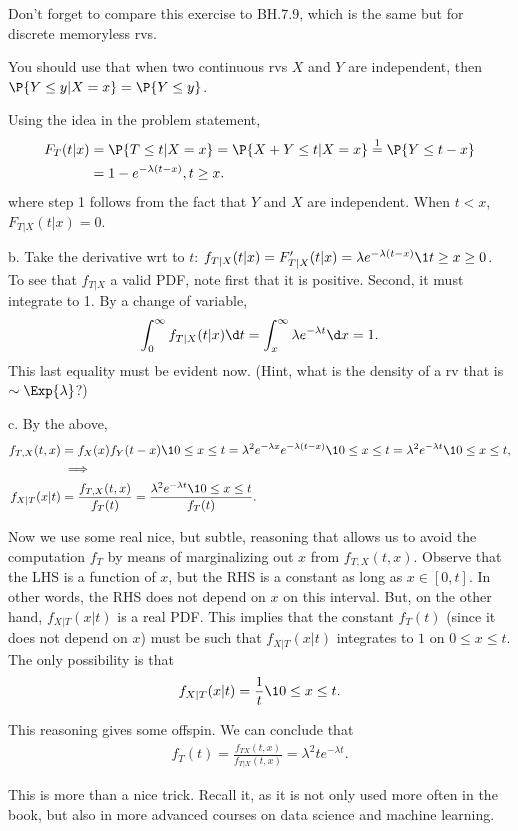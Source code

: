 
\setcounter{theorem}{9}
\begin{exercise}[BH.7.10]
Don't forget to compare  this exercise to BH.7.9, which is the same but for discrete memoryless rvs.

You should use that when two continuous rvs $X$ and $Y$ are independent, then $\P{Y\leq y | X=x} = \P{Y\leq y}$.

\begin{solution}
Using the idea in the problem statement,
\begin{align*}
F_T(t|x) &= \P{T\leq t|X=x} = \P{X+Y\leq t|X=x} \stackrel{1}=\P{Y\leq t-x} \\
&=1 - e^{-\lambda(t-x)}, t \geq x.
\end{align*}
where step 1 follows from the fact that $Y$ and $X$ are independent. When $t<x$, $F_{T|X}(t|x) = 0$.

b. Take the derivative wrt to $t$: $f_{T|X} (t|x) = F_{T|X}'(t|x) = \lambda e^{-\lambda (t-x)}\1{t\geq x\geq 0}$. To see that $f_{T|X}$ a valid PDF, note first that it is positive. Second, it must integrate to 1. By a change of variable,
\begin{align*}
\int_0^{\infty}  f_{T|X} (t|x) \d t = \int_x^{\infty} \lambda e^{-\lambda t} \d x = 1.
\end{align*}
This last equality must be evident now. (Hint, what is the density of a rv  that is $\sim \Exp{\lambda}$?)


c. By the above,
\begin{align*}
f_{T,X}(t,x)  &=  f_X(x)f_Y(t-x) \1{0\leq x \leq t} = \lambda^2 e^{-\lambda x} e^{-\lambda(t-x)} \1{0\leq x \leq t} = \lambda^2e^{-\lambda t} \1{0\leq x\leq t},\\
  &\implies  \\
  f_{X|T}(x|t) &= \frac{f_{T,X}(t,x)}{f_T(t)}  = \frac{\lambda^2e^{-\lambda t} \1{0\leq x\leq t}}{f_T(t)}.
\end{align*}

Now we use some real nice, but subtle, reasoning that allows us to avoid the computation $f_T$ by means of marginalizing out $x$ from $f_{T,X}(t, x)$.
Observe that the LHS is a function of $x$, but the RHS is a constant as long as $x\in [0, t]$.  In other words, the RHS does not depend on $x$ on this interval.
But, on the other hand,  $f_{X|T}(x|t)$ is  a real PDF.
This implies that the constant $f_T(t)$ (since it does not depend on $x$) must be such that $f_{X|T}(x|t)$ integrates to $1$ on $0\leq x \leq t$.
The only possibility is that
\begin{equation*}
f_{X|T}(x|t) = \frac{1}{t}\1{0\leq x \leq t}.
\end{equation*}

This reasoning gives some  offspin.  We can conclude that
\begin{align*}
  f_T(t) = \frac{f_{TX}(t, x)}{f_{T|X}(t,x)}= \lambda^2 t e^{-\lambda t}.
\end{align*}


This is more than a nice trick. Recall it, as it is not only used more often in the book, but also in more advanced courses on data science and machine learning.
\end{solution}
\end{exercise}
